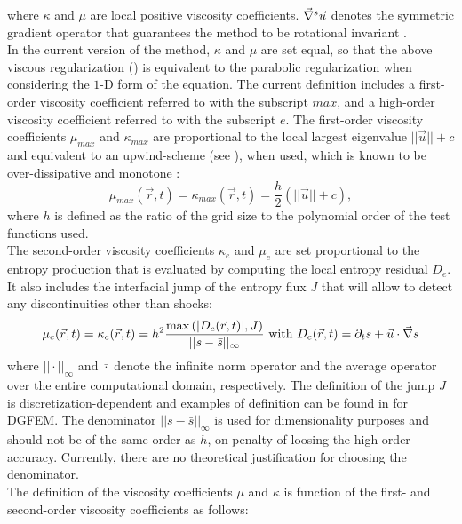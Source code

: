 where $\kappa$ and $\mu$ are local positive viscosity coefficients. $\vec{\nabla}^s \vec{u}$ denotes the symmetric gradient operator that guarantees the method to be rotational invariant \cite{jlg}.\\
In the current version of the method, $\kappa$ and $\mu$ are set equal, so that the above viscous regularization () is equivalent to the parabolic regularization \cite{Parabolic} when considering the $1$-D form of the equation. The current definition includes a first-order viscosity coefficient referred to with the subscript $max$, and a high-order viscosity coefficient referred to with the subscript $e$. The first-order viscosity coefficients $\mu_{max}$ and $\kappa_{max}$ are proportional to the local largest eigenvalue $|| \vec{u} || + c $ and equivalent to an upwind-scheme (see ), when used, which is known to be over-dissipative and monotone \cite{Toro}: 
\begin{equation}
\label{eq:fo}
\mu_{max}(\vec{r}, t) = \kappa_{max}(\vec{r}, t) = \frac{h}{2} \left( || \vec{u} || + c \right),
\end{equation}
where $h$ is defined as the ratio of the grid size to the polynomial order of the test functions used. \\
The second-order viscosity coefficients $\kappa_e$ and $\mu_e$ are set proportional to the entropy production that is evaluated by computing the local entropy residual $D_e$. It also includes the interfacial jump of the entropy flux $J$ that will allow to detect any discontinuities other than shocks:
\begin{equation}
\label{eq:ent_visc_coeff}
\mu_e(\vec{r},t) = \kappa_e(\vec{r},t) = h^2 \frac{\max\left( | D_e(\vec{r},t) |, J \right)}{|| s - \bar{s} ||_{\infty}} \text{ with } D_e(\vec{r}, t) = \partial_t s + \vec{u} \cdot \vec{\nabla} s
\end{equation}
where $|| \cdot ||_{\infty}$ and $\bar{\cdot}$ denote the infinite norm operator and the average operator over the entire computational domain, respectively. The definition of the jump $J$ is discretization-dependent and examples of definition can be found in \cite{valentin} for DGFEM. The denominator $|| s - \bar{s} ||_{\infty}$ is used for dimensionality purposes and should not be of the same order as $h$, on penalty of loosing the high-order accuracy. Currently, there are no theoretical justification for choosing the denominator. \\
The definition of the viscosity coefficients $\mu$ and $\kappa$ is function of the first- and second-order viscosity coefficients as follows:
